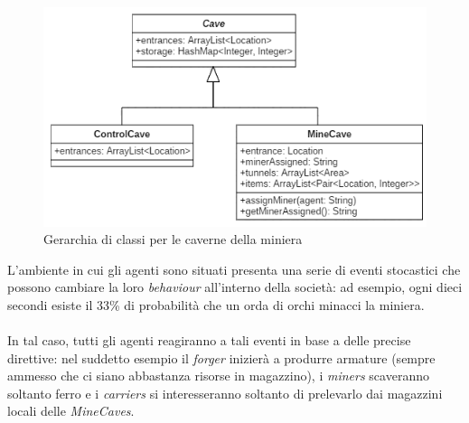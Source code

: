 \documentclass{llncs}
\begin{document}
\begin{figure}
  \centering
   \includegraphics[scale = 0.7]{img/diagramCaves.png}
  \caption{Gerarchia di classi per le caverne della miniera}
\end{figure}


\vspace{21cm}

L'ambiente in cui gli agenti sono situati presenta una serie di eventi stocastici che possono cambiare la loro \textit{behaviour} all'interno della società: ad esempio, ogni dieci secondi esiste il 33\% di probabilità che un orda di orchi minacci la miniera.\\\\
In tal caso, tutti gli agenti reagiranno a tali eventi in base a delle precise direttive: nel suddetto esempio il \textit{forger} inizierà a produrre armature (sempre ammesso che ci siano abbastanza risorse in magazzino), i \textit{miners} scaveranno soltanto ferro e i \textit{carriers} si interesseranno soltanto di prelevarlo dai magazzini locali delle \textit{MineCaves}.
\newpage
\end{document}
